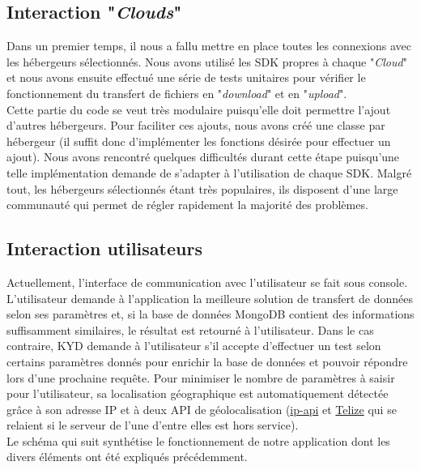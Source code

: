 \documentclass[10pt]{article}
\begin{document}
\subsection{Interaction "\textit{Clouds}"}

Dans un premier temps, il nous a fallu mettre en place toutes les connexions avec les hébergeurs sélectionnés. Nous avons utilisé les SDK propres à chaque "\textit{Cloud}" et nous avons ensuite effectué une série de tests unitaires pour vérifier le fonctionnement du transfert de fichiers en "\textit{download}" et en "\textit{upload}".\\

Cette partie du code se veut très modulaire puisqu'elle doit permettre l'ajout d'autres hébergeurs. Pour faciliter ces ajouts, nous avons créé une classe par hébergeur (il suffit donc d'implémenter les fonctions désirée pour effectuer un ajout). Nous avons rencontré quelques difficultés durant cette étape puisqu'une telle implémentation demande de s'adapter à l'utilisation de chaque SDK. Malgré tout, les hébergeurs sélectionnés étant très populaires, ils disposent d'une large communauté qui permet de régler rapidement la majorité des problèmes.

\subsection{Interaction utilisateurs}

Actuellement, l'interface de communication avec l'utilisateur se fait sous console. L'utilisateur demande à l'application la meilleure solution de transfert de données selon ses paramètres et, si la base de données MongoDB contient des informations suffisamment similaires, le résultat est retourné à l'utilisateur. Dans le cas contraire, KYD demande à l'utilisateur s'il accepte d'effectuer un test selon certains paramètres donnés pour enrichir la base de données et pouvoir répondre lors d'une prochaine requête. Pour minimiser le nombre de paramètres à saisir pour l'utilisateur, sa localisation géographique est automatiquement détectée grâce à son adresse IP et à deux API de géolocalisation (\href{http://ip-api.com/docs/api:json}{ip-api} et \href{http://www.telize.com/}{Telize} qui se relaient si le serveur de l'une d'entre elles est hors service).\\

Le schéma qui suit synthétise le fonctionnement de notre application dont les divers éléments ont été expliqués précédemment.
\end{document}
